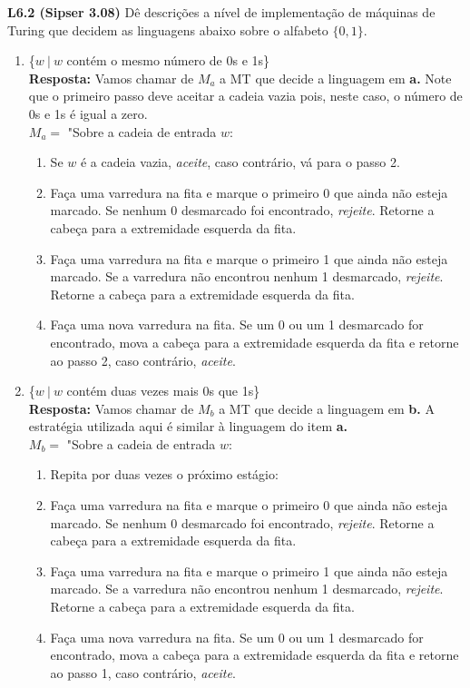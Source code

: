 
\noindent \textbf{L6.2 (Sipser 3.08)} Dê descrições a nível de implementação de máquinas de Turing que decidem as linguagens abaixo sobre o alfabeto $\{0, 1\}$.
\begin{enumerate}[label={\textbf{\alph*.}}]
\item \{$w\ |\ w$ contém o mesmo número de 0s e 1s\}\\[3pt]
\textbf{Resposta: } Vamos chamar de $M_a$ a MT que decide a linguagem em \textbf{a.} Note que o primeiro passo deve aceitar a cadeia vazia pois, neste caso, o número de 0s e 1s é igual a zero.\\[3pt]
$M_a = $ "Sobre a cadeia de entrada $w$:
\begin{enumerate}[label={\textbf{\arabic*.}}, leftmargin=1in]
\item Se $w$ é a cadeia vazia, \textit{aceite}, caso contrário, vá para o passo 2.
\item Faça uma varredura na fita e marque o primeiro 0 que ainda não esteja marcado. Se nenhum 0 desmarcado foi encontrado, \textit{rejeite}. Retorne a cabeça para a extremidade esquerda da fita.
\item Faça uma varredura na fita e marque o primeiro 1 que ainda não esteja marcado. Se a varredura não encontrou nenhum 1 desmarcado, \textit{rejeite}. Retorne a cabeça para a extremidade esquerda da fita.
\item Faça uma nova varredura na fita. Se um 0 ou um 1 desmarcado for encontrado, mova a cabeça para a extremidade esquerda da fita e retorne ao passo 2, caso contrário, \textit{aceite}.
\end{enumerate}

\item \{$w\ |\ w$ contém duas vezes mais 0s que 1s\}\\[3pt]
\textbf{Resposta: } Vamos chamar de $M_b$ a MT que decide a linguagem em \textbf{b.} A estratégia utilizada aqui é similar à linguagem do item \textbf{a.}\\[3pt]
$M_b = $ "Sobre a cadeia de entrada $w$:
\begin{enumerate}[label={\textbf{\arabic*.}}, leftmargin=1in]
\item Repita por duas vezes o próximo estágio:
\item \begin{addmargin}[1em]{0em}
Faça uma varredura na fita e marque o primeiro 0 que ainda não esteja marcado. Se nenhum 0 desmarcado foi encontrado, \textit{rejeite}. Retorne a cabeça para a extremidade esquerda da fita.
\end{addmargin}
\item Faça uma varredura na fita e marque o primeiro 1 que ainda não esteja marcado. Se a varredura não encontrou nenhum 1 desmarcado, \textit{rejeite}. Retorne a cabeça para a extremidade esquerda da fita.
\item Faça uma nova varredura na fita. Se um 0 ou um 1 desmarcado for encontrado, mova a cabeça para a extremidade esquerda da fita e retorne ao passo 1, caso contrário, \textit{aceite}.


\end{enumerate}
\end{enumerate}
